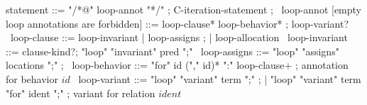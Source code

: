 \begin{syntax}
  statement ::= "/*@" loop-annot "*/" ;
  C-iteration-statement ;
  \
  loop-annot [empty loop annotations are forbidden] ::= loop-clause* loop-behavior* ;
                 loop-variant?
  \
  loop-clause ::= loop-invariant | loop-assigns ;
                | loop-allocation
  \
  loop-invariant ::= clause-kind?;
                     "loop" "invariant" pred ";" 
  \
  loop-assigns ::= "loop" "assigns" locations ";" ;
  \
  loop-behavior ::= "for" id ("," id)* ":" loop-clause+ ; annotation for behavior $id$
  \
  loop-variant ::= "loop" "variant" term ";" ;
  | "loop" "variant" term "for" ident ";" ; variant for relation $ident$
\end{syntax}

